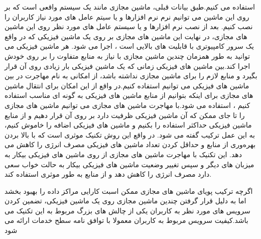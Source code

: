    استفاده می کنیم.طبق بیانات قبلی،  ماشین مجازی مانند یک سیستم واقعی است که بر روی این ماشین می توانیم نرم نرم افزارها و یا سیتم عامل های مورد نیاز کاربران را نصب کنیم. بعد از نصب نرم افزارها و یا سیستم عامل های مورد نظر روی این ماشین های مجازی، در نهایت این ماشین های مجازی بر روی یک ماشین فیزیکی که در واقع یک سرور کامپیوتری با قابلیت های بالایی است ، اجرا می شود. هر ماشین فیزیکی می توانید به طور همزمان چندین ماشین مجازی با نیاز به منابع متفاوت را بر روی خودش اجرا کند.بین ماشین های فیزیکی زمانی که یک ماشین فیزیکی بار زیادی روی آن قرار بگیرد و منابع لازم را برای ماشین مجازی نداشته باشد، از امکانی به نام مهاجرت در بین ماشین های فیزیکی می توانیم استفاده کنیم.در واقع از این امکان برای انتقال ماشین های مجازی برای اینکه بتوانیم از منابع ماشین های فیزیکی به گونه ای مناسب استفاده کنیم ، استفاده می شود.با مهاجرت ماشین های مجازی می توانیم ماشین های مجازی را تا جای ممکن که آن ماشین فیزیکی ظرفیت دارد بر روی آن قرار دهیم و از منابع ماشین فیزیکی حداکثر استفاده را بکنیم و ماشین های فیزیکی اضافه را خاموش کنیم، به این عمل ترکیب گفته می شود. در واقع این روش تکنیک موثری است که با بالا بردن بهره‌وری از منابع و حداقل کردن تعداد ماشین های فیزیکی مصرف انرژی را کاهش می دهد. این تکنیک با مهاجرت ماشین های مجازی از روی ماشین های فیزیکی بیکار به میزبان های دیگر و سپس تغییر وضعیت ماشین های فیزیکی بیکار به حالت خواب سعی دارد مصرف انرژی را کاهش دهد و از منابع به طور موثری استفاده کند.
\cite{num5,num6,num7}
   
  
  اگرچه ترکیب پویای ماشین های مجازی ممکن اسبت کارایی مراکز داده را بهبود بخشد 
  اما به دلیل قرار گرفتن چندین ماشین مجازی روی یک ماشین فیزیکی، تضمین کردن سرویس های مورد نظر به کاربران یکی از چالش های بزرگ مربوط به این تکنیک می باشد.کیفیت سرویس مربوط به کاربران معمولا با توافق نامه سطح خدمات
    ارائه می شود
\cite{num7}

